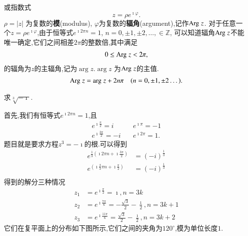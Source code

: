 或指数式
\begin{equation}
    z = \rho e^{\imath \varphi} .
\end{equation}
$\rho = |z|$ 为复数的{\bf 模}(modulus), $\varphi$为复数的{\bf 辐角}(argument),记作${\mathrm{Arg}\;} z$.
对于任意一个$z=\rho e^{\imath \varphi}$,由于恒等式$e^{\imath 2\pi n} = 1$, $n = 0, \pm 1, \pm 2, \dots, \in \mathbb{Z}$,
可以知道辐角${\mathrm{Arg}\;} z$不能唯一确定,它们之间相差$2\pi$的整数倍,其中满足
\begin{align}
    0 \leq {\mathrm{Arg}\;} z < 2\pi ,
\end{align}
的辐角为$z$的主辐角,记为$\arg z$.$\arg z$ 为${\mathrm{Arg}\;} z$的主值.
\begin{align}
    {\mathrm{Arg}\;} z = {\mathrm{arg}\;} z + 2 n \pi \quad (n = 0, \pm 1, \pm 2\dots).
\end{align}


\begin{example}
求$\sqrt[3]{-\imath}$.
\end{example}
\begin{solution}

\begin{minipage}{0.7\textwidth}
    首先,我们有恒等式$e^{\imath 2\pi n} = 1$,且
    \begin{align*}
        e^{\imath \frac{\pi}{2}}  = i & \quad  e^{\imath \pi}  =-1 \\
        e^{\imath \frac{3\pi}{2}} = -i & \quad e^{\imath 2\pi} = 1.
    \end{align*}
题目就是要求方程$z^3 =-\imath$的根.可以得到
    \begin{align*}
        e^{\frac{1}{3}(\imath 2\pi n + \imath \frac{3\pi}{2})} & = (-i)^{\frac{1}{3}} \\
        e^{(\imath \frac{2}{3}\pi n + \imath \frac{\pi}{2})}   & =  (-i)^{\frac{1}{3}} \\
    \end{align*}
得到的解分三种情况
    \begin{align*}
        z_1 &=e^{\imath \frac{\pi}{2}} = \imath , n = 3k \\
        z_2 &=e^{\imath \frac{7\pi}{6}} = -\frac{\sqrt{3}}{2} - \frac{\imath}{2} , n = 3k +1 \\
        z_3 &=e^{\imath \frac{11\pi}{6}} = \frac{\sqrt{3}}{2} - \frac{\imath}{2} , n = 3k +2 
    \end{align*}
它们在复平面上的分布如下图所示,它们之间的夹角为$120^\circ$,模为单位长度$1$.
\end{minipage}
\begin{minipage}{0.3\textwidth}
        
\end{minipage}

\end{solution}

